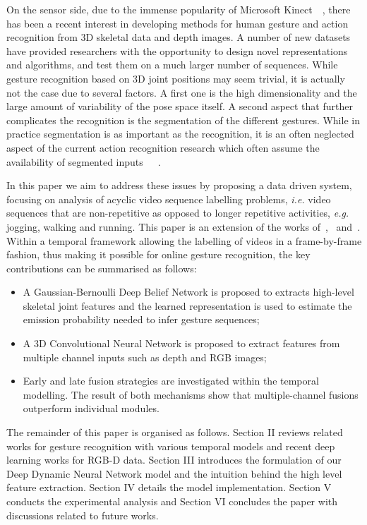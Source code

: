 On the sensor side, due to the immense popularity of Microsoft Kinect~\cite{shotton2011real}~\cite{lingshao2}, there has been a recent interest in developing methods for human gesture and action recognition from 3D skeletal data and depth images.
A number of new datasets~\cite{ICMI,fothergill2012instructing,guyon2012chalearn,wang2012mining} have provided researchers with the opportunity to design novel representations and algorithms, and test them on a much larger number of sequences.
While gesture recognition based on 3D joint positions may seem trivial, it is actually not the case due to several factors. A first one is the high dimensionality and the large amount of variability of the pose space itself.
A second aspect that further complicates the recognition is the segmentation of the different gestures. While in practice segmentation is as important as the recognition, it is an often neglected aspect of the current action recognition research which often assume the availability of segmented inputs~\cite{laptev2005space}~\cite{marszalek09}~\cite{Kuehne11}.

In this paper we aim to address these issues by proposing a data driven system, focusing on analysis of acyclic video sequence labelling problems, \emph{i.e.} video sequences that are non-repetitive as opposed to longer repetitive activities, \textit{e.g.} jogging, walking and running. This paper is an extension of the works of~\cite{diwucvpr14},~\cite{wu2014deep} and~\cite{lio2014deep}.
Within a temporal framework allowing the labelling of videos in a frame-by-frame fashion,
thus making it possible for online gesture recognition, the key contributions can be summarised as follows:
\begin{itemize}
\item A Gaussian-Bernoulli Deep Belief Network is proposed to extracts high-level skeletal joint features and the learned representation is used to estimate the emission probability needed to infer gesture sequences;
\item A 3D Convolutional Neural Network  is proposed to extract features from multiple channel inputs such as depth and  RGB images;
\item Early and late fusion strategies are investigated within the temporal modelling. The result of both mechanisms
show that multiple-channel fusions outperform individual modules.
\end{itemize}

The remainder of this paper is organised as follows. Section II reviews related works for gesture recognition with various temporal models and recent deep learning works for RGB-D data. Section III introduces the formulation of our Deep Dynamic Neural Network model and the intuition behind the high level feature extraction. Section IV details the model implementation. Section V conducts the experimental analysis and Section VI concludes the paper with discussions related to future works.


\endinput

